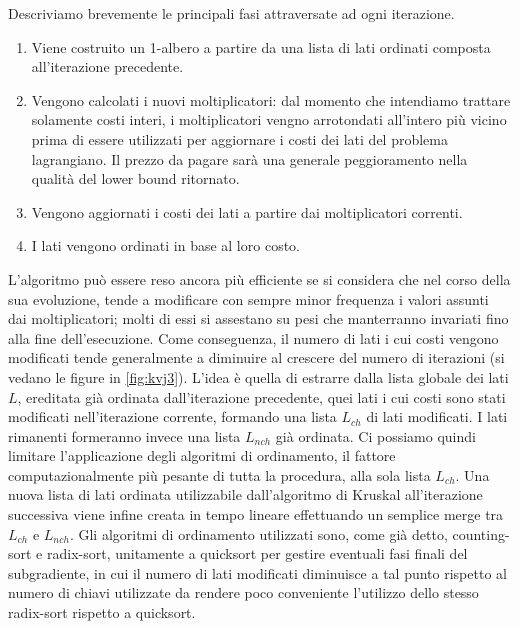 Descriviamo brevemente le principali fasi attraversate ad ogni iterazione.
\begin{enumerate}[noitemsep]
\item Viene costruito un 1-albero a partire da una lista di lati ordinati composta all'iterazione precedente. 
\item Vengono calcolati i nuovi moltiplicatori: dal momento che intendiamo trattare solamente costi interi, i moltiplicatori vengno arrotondati all'intero più vicino prima di essere utilizzati per aggiornare i costi dei lati del problema lagrangiano. Il prezzo da pagare sarà una generale peggioramento nella qualità del lower bound ritornato. 
\item Vengono aggiornati i costi dei lati a partire dai moltiplicatori correnti.
\item I lati vengono ordinati in base al loro costo.
\end{enumerate}

L'algoritmo può essere reso ancora più efficiente se si considera che nel corso della sua evoluzione, tende a modificare con sempre minor frequenza i valori assunti dai moltiplicatori; molti di essi si assestano su pesi che manterranno invariati fino alla fine dell'esecuzione. Come conseguenza, il numero di lati i cui costi vengono modificati tende generalmente a diminuire al crescere del numero di iterazioni (si vedano le figure in \ref{fig:kvj3}). L'idea è quella di estrarre dalla lista globale dei lati $L$, ereditata già ordinata dall'iterazione precedente, quei lati i cui costi sono stati modificati nell'iterazione corrente, formando una lista $L_{ch}$ di lati modificati. I lati rimanenti formeranno invece una lista $L_{nch}$ già ordinata. Ci possiamo quindi limitare l'applicazione degli algoritmi di ordinamento, il fattore computazionalmente più pesante di tutta la procedura, alla sola lista $L_{ch}$. Una nuova lista di lati ordinata utilizzabile dall'algoritmo di Kruskal all'iterazione successiva viene infine creata in tempo lineare effettuando un semplice merge tra $L_{ch}$ e $L_{nch}$. 
Gli algoritmi di ordinamento utilizzati sono, come già detto, counting-sort e radix-sort, unitamente a quicksort per gestire eventuali fasi finali del subgradiente, in cui il numero di lati modificati diminuisce a tal punto rispetto al numero di chiavi utilizzate da rendere poco conveniente l'utilizzo dello stesso radix-sort rispetto a quicksort.

